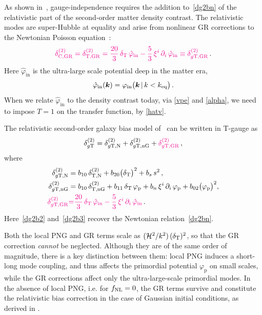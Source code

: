{{{As shown in~\cite{Umeh:2019qyd,Umeh:2019jqg}, gauge-independence requires the addition to~\eqref{dg2bn} of the relativistic part of the second-order matter density contrast. The relativistic modes are super-Hubble at equality and arise from nonlinear GR corrections to the Newtonian Poisson equation~\cite{Bruni:2013qta,Bartolo:2015qva,Villa:2015ppa,Tram:2016cpy}: 
\begin{align} \label{dtgr2}
{\color{magenta}{\delta_{\mathrm{C,GR}}^{{(2)}}=\delta_{\mathrm{T,GR}}^{{(2)}} =
\frac{20}{3}\, \delta_{{\mathrm{T}}}\,{\hat{\varphi}_{\mathrm{in}}} 
- \frac{5}{3}\, \xi^i\,\partial_i \, {\hat\varphi_{\mathrm{in}}} \equiv \delta^{{(2)}}_{g{\mathrm{T,GR}}}}}\,. 
\end{align}
Here $\hat\varphi_{\mathrm{in}}$ is the ultra-large scale potential deep in the matter era, 
\begin{equation} \label{hatv}
 \hat\varphi_{\mathrm{in}}(\bm {k}) =  \varphi_{\mathrm{in}}\big(\bm {k}\, | \, k<k_{\mathrm{eq}}\big) \,.
\end{equation}
When we relate $\hat\varphi_{\mathrm{in}}$ to the density contrast today, via \eqref{vpe} and \eqref{alpha}, we need to impose $T=1$ on the transfer function, by \eqref{hatv}.}

The relativistic second-order galaxy bias model of~\cite{Umeh:2019jqg} can  be written in T-gauge as
\begin{equation}
\delta^{{(2)}}_{g{\mathrm{T}}} = \delta^{{(2)}}_{g{\mathrm{T,N}}}+ \delta_{g\mathrm{T,nG}}^{{(2)}} +{\color{magenta}{\delta^{{(2)}}_{g{\mathrm{T,GR}}}}}
\,,
\label{dg2b1}
\end{equation}
where
\begin{align}
\delta^{{(2)}}_{g{\mathrm{T,N}}} &= b_{10}\, \delta^{{(2)}}_{{\mathrm{T,N}}}+ b_{20} \big(\delta_{{\mathrm{T}}}\big)^2   + b_s\,s^2 \,,
\label{dg2b2}\\
\delta_{g\mathrm{T,nG}}^{{(2)}} &= b_{10}\,  \delta_{\mathrm{T,nG}}^{{(2)}}
 + b_{11}\, \delta_{{\mathrm{T}}}\,\varphi_{\mathrm{p}} +  b_{{n}}\, \xi^i\,\partial_i\,\varphi_{\mathrm{p}}+b_{02} \big(\varphi_{\mathrm{p}}\big)^2,
\label{dg2b3} \\
{\color{magenta}{\delta^{{(2)}}_{g{\mathrm{T,GR}}}}}&{\color{magenta}{=}} {\color{magenta}{\frac{20}{3}\, \delta_{{\mathrm{T}}}\,\hat\varphi_{{\mathrm{in}}} - \frac{5}{3}\, \xi^i\,\partial_i\,\hat\varphi_{{\mathrm{in}}}}} \,. \label{dg2b}
\end{align}
Here~\eqref{dg2b2} and~\eqref{dg2b3} recover the Newtonian relation~\eqref{dg2bn}.  

{Both the local PNG and GR terms scale as  $(\mathcal{H}^2/k^2)\,(\delta_{\mathrm{T}})^2$, {so that the GR correction {\em cannot} be neglected.
Although they are of the same order of magnitude, there is a key distinction between them:} 
 {local PNG induces a short-long mode coupling, and thus affects the primordial potential $\varphi_{\mathrm{p}}$ on small scales, while the GR corrections affect only the ultra-large-scale primordial  modes.} In the absence of local PNG, i.e. for $f_\text{NL}=0$, the GR terms  survive
and constitute the relativistic bias correction in the case of Gaussian initial conditions, as derived in \cite{Umeh:2019qyd}.


}}}
